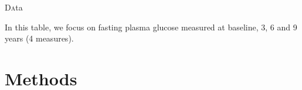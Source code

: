 \begin{frame}{\lettrine{D}ata}
\par{In this table, we focus on fasting plasma glucose measured at baseline, 3, 6 and 9 years (4 measures).}
\begin{center}
\end{center}
\end{frame}


\section{Methods}
